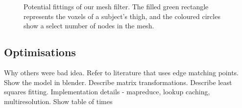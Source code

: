 \begin{figure}[b]
	\centering
	\qquad
	\caption{Potential fittings of our mesh filter.
		The filled green rectangle represents the voxels of a subject's thigh,
		and the coloured circles show a select number of nodes in the mesh.}
	\label{FittingImages}
\end{figure}

\subsection{Optimisations}

Why others were bad idea.
Refer to literature that uses edge matching points.
Show the model in blender.
Describe matrix transformations.
Describe least squares fitting.
Implementation details - mapreduce, lookup caching, multiresolution.  Show table of times